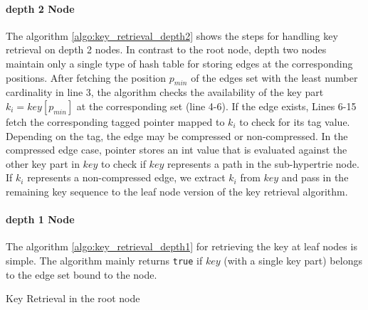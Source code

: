 \paragraph{depth 2 Node} The algorithm \ref{algo:key_retrieval_depth2} shows the steps for handling key retrieval on depth 2 nodes. In contrast to the root node, depth two nodes maintain only a single type of hash table for storing edges at the corresponding positions. After fetching the position $p_{min}$ of the edges set with the least number cardinality in line 3, the algorithm checks the availability of the key part  $k_i = key[p_{min}]$ at the corresponding set (line 4-6). If the edge exists, Lines 6-15 fetch the corresponding tagged pointer mapped to $k_i$ to check for its tag value. Depending on the tag, the edge may be compressed or non-compressed. In the compressed edge case, pointer stores an int value that is evaluated against the other key part in $key$ to check if $key$ represents a path in the sub-hypertrie node. If $k_i$ represents a non-compressed edge, we extract $k_i$ from $key$ and pass in the remaining key sequence to the leaf node version of the key retrieval algorithm. 

\paragraph{depth 1 Node} The algorithm \ref{algo:key_retrieval_depth1} for retrieving the key at leaf nodes is simple. The algorithm mainly returns \verb|true| if $key$ (with a single key part) belongs to the edge set bound to the node.

\begin{algorithm}
	\DontPrintSemicolon
	\SetAlgoLined
     \;
\caption{\sc Key Retrieval in the root node}
\label{algo:key_retrieval_depth3}

\end{algorithm}


